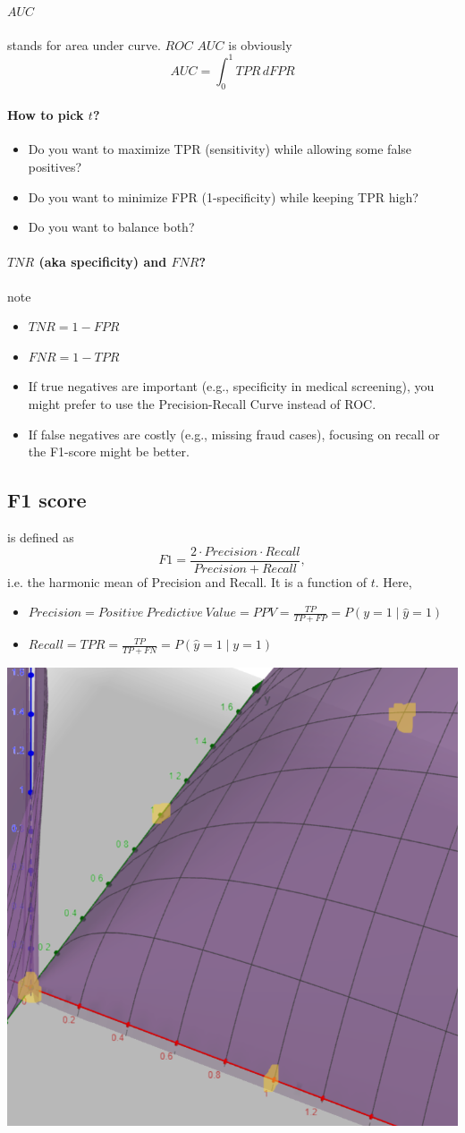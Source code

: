 \documentclass[twoside,11pt]{article}
\begin{document}
\paragraph{$AUC$} stands for area under curve. $ROC$ $AUC$ is obviously
$$ AUC = \int_0^1 TPR \, dFPR $$

\paragraph{How to pick $t$?}
\begin{itemize}
    \item Do you want to maximize TPR (sensitivity) while allowing some false positives?
    \item Do you want to minimize FPR (1-specificity) while keeping TPR high?
    \item Do you want to balance both?
\end{itemize}

\paragraph{$TNR$ (aka specificity) and $FNR$?}
note
\begin{itemize}
    \item $TNR = 1-FPR$
    \item $FNR = 1-TPR$
    \item If true negatives are important (e.g., specificity in medical screening), you might prefer to use the Precision-Recall Curve instead of ROC.
    \item If false negatives are costly (e.g., missing fraud cases), focusing on recall or the F1-score might be better.
\end{itemize}

\subsection{F1 score} is defined as
$$ F1 = \frac{2 \cdot Precision \cdot Recall}{Precision+Recall}, $$
i.e. the harmonic mean of Precision and Recall. It is a function of $t$. Here,
\begin{itemize}
    \item $Precision = Positive\ Predictive\ Value = PPV = \frac{TP}{TP + FP} = P(y = 1 \mid \hat y=1)$
    \item $Recall = TPR = \frac{TP}{TP + FN} = P(\hat y=1 \mid y=1)$
\end{itemize}

\begin{center}
    \includegraphics[width=.3\textwidth]{harmonic_mean.png}
\end{center}
\end{document}
